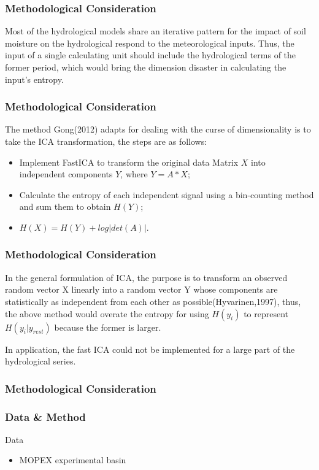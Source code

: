\documentclass{beamer}
\begin{document}
\begin{CJK}{UTF8}{gkai}
\begin{frame}
\frametitle{Methodological Consideration}
Most of the hydrological models share an iterative pattern for the impact of soil moisture on the hydrological respond to the meteorological inputs. Thus, the input of a single calculating unit should include the hydrological terms of the former period, which would bring the dimension disaster in calculating the input's entropy.

\end{frame}

\begin{frame}
\frametitle{Methodological Consideration}

The method Gong(2012) adapts for dealing with the curse of dimensionality is to take the ICA transformation, the steps are as follows:
\begin{itemize}
\item Implement FastICA to transform the original data Matrix $X$ into independent components $Y$, where $Y=A*X$;
\item Calculate the entropy of each independent signal using a bin-counting method and sum them to obtain $H(Y)$;
\item $H(X)=H(Y)+log|det(A)|$.
\end{itemize}

\end{frame}

\begin{frame}
\frametitle{Methodological Consideration}
In the general formulation of ICA, the purpose is to transform an observed random vector X linearly into a random vector Y whose components are statistically as independent from each other as possible(Hyvarinen,1997), thus, the above method would overate the entropy for using $H(y_i)$ to represent $H(y_i|y_{rest})$ because the former is larger.
 
In application, the fast ICA could not be implemented for a large part of the hydrological series.
\end{frame}

\begin{frame}
\frametitle{Methodological Consideration}

\end{frame} 
\begin{frame}
\frametitle{Data \& Method}
 Data 
 \begin{itemize}
 \item MOPEX experimental basin 
 \end{itemize}
 

\end{frame}
\end{CJK}
\end{document}

